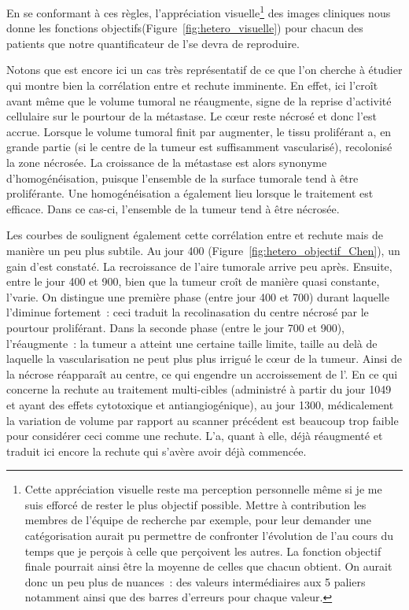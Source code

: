 \documentclass[main.tex]{subfiles}
\begin{document}
En se conformant à ces règles, l'appréciation visuelle\footnote{\samepage Cette appréciation visuelle reste ma perception personnelle même si je me suis efforcé de rester le plus objectif possible. Mettre à contribution les membres de l'équipe de recherche par exemple, pour leur demander une catégorisation aurait pu permettre de confronter l'évolution de l'\hetero au cours du temps que je perçois à celle que perçoivent les autres. La fonction objectif finale pourrait ainsi être la moyenne de celles que chacun obtient. On aurait donc un peu plus de nuances~: des valeurs intermédiaires aux 5 paliers notamment ainsi que des barres d'erreurs pour chaque valeur.}
 des images cliniques nous donne les fonctions objectifs\HHobj (\cf Figure~\ref{fig:hetero_visuelle}) pour chacun des patients que notre quantificateur de l'\hetero se devra de reproduire. 
 
 
Notons que \Nber est encore ici un cas très représentatif de ce que l'on cherche à étudier \ie qui montre bien la corrélation entre \hetero et rechute imminente. En effet, ici l'\hetero croît avant même que le volume tumoral ne réaugmente, signe de la reprise d'activité cellulaire sur le pourtour de la métastase. Le c\oe{}ur reste nécrosé et donc l'\hetero est accrue. Lorsque le volume tumoral  finit par augmenter, le tissu proliférant a, en grande partie (si le centre de la tumeur est suffisamment vascularisé), recolonisé la zone nécrosée. La croissance de la métastase est alors synonyme d'homogénéisation, puisque l'ensemble de la surface tumorale tend à être proliférante. Une homogénéisation a également lieu lorsque le traitement est efficace. Dans ce cas-ci, l'ensemble de la tumeur tend à être nécrosée. 


Les courbes de \Chen soulignent également cette corrélation entre \hetero et rechute mais de manière un peu plus subtile. Au jour 400 (\cf Figure~\ref{fig:hetero_objectif_Chen}), un gain d'\hetero est constaté. La recroissance de l'aire tumorale arrive peu après. Ensuite, entre le jour 400 et 900, bien que la tumeur croît de manière quasi constante, l'\hetero varie. On distingue une première phase (entre jour 400 et 700) durant laquelle l'\hetero diminue fortement~: ceci traduit la recolinasation du centre nécrosé par le pourtour proliférant. Dans la seconde phase (entre le jour 700 et 900), l'\hetero réaugmente~: la tumeur a atteint une certaine taille limite, taille au delà de laquelle la vascularisation ne peut plus plus irrigué le c\oe{}ur de la tumeur. Ainsi de la nécrose réapparaît au centre, ce qui engendre un accroissement de l'\hetero. 
En ce qui concerne la rechute au traitement multi-cibles (administré à partir du jour 1049 et ayant des effets cytotoxique et antiangiogénique), au jour 1300, médicalement la variation de volume par rapport au scanner précédent est beaucoup trop faible pour considérer ceci comme une rechute. L'\hetero a, quant à elle, déjà réaugmenté et traduit ici encore la rechute qui s'avère avoir déjà commencée.  
\end{document}

